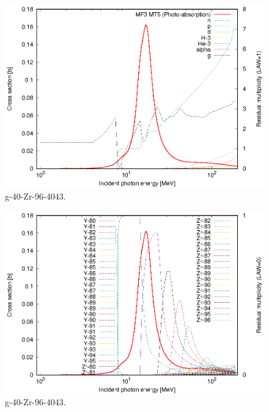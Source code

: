 \begin{figure}
 \includegraphics[width=\linewidth]{eps/g_40-Zr-96_4043.eps}
  \caption{g-40-Zr-96-4043.}
\end{figure}
\begin{figure}
 \includegraphics[width=\linewidth]{eps-law0/g_40-Zr-96_4043.eps}
 \caption{g-40-Zr-96-4043.}
\end{figure}
\newpage \clearpage


